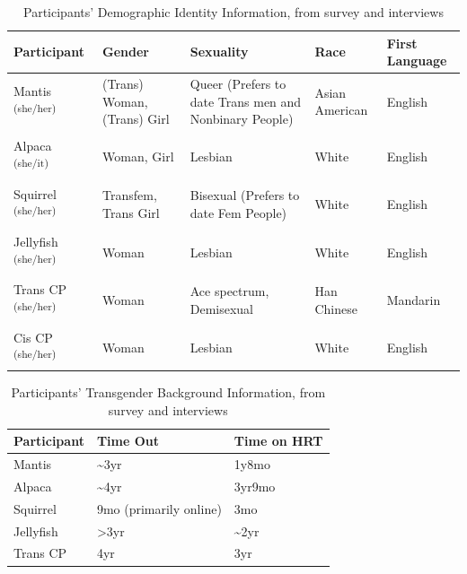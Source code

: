 \documentclass[12pt,twoside]{reedthesis}
\begin{document}
\begin{table}[h]
\begin{small}
\begin{tabular}{l p{2.8cm} p{3.2cm} p{2.2cm} p{1.8cm}} \toprule
Participant & Gender & Sexuality & Race & First \newline Language \\
\midrule
Mantis \textsuperscript{(she/her)} & (Trans) Woman, \newline (Trans) Girl & Queer (Prefers to date Trans men and Nonbinary People) & Asian American & English \\\\
Alpaca \textsuperscript{(she/it)} &  Woman, Girl & Lesbian & White & English \\\\
Squirrel \textsuperscript{(she/her)} &  Transfem, \newline Trans Girl & Bisexual (Prefers to date Fem People) & White & English \\\\
Jellyfish \textsuperscript{(she/her)} &  Woman & Lesbian & White & English \\\\
Trans CP \textsuperscript{(she/her)} &  Woman & Ace spectrum, \newline Demisexual & Han Chinese & Mandarin\\\\
Cis CP \textsuperscript{(she/her)} & Woman & Lesbian & White & English\\
\bottomrule
\end{tabular}
\end{small}
\label{demographics}
\caption{Participants' Demographic Identity Information, from survey and interviews}
\end{table}

\begin{table}[h]
\centering
\begin{small}
\begin{tabular}{l l l} \toprule
Participant & Time Out & Time on HRT  \\
\midrule
Mantis & \textasciitilde3yr & 1y8mo \\
Alpaca &  \textasciitilde4yr & 3yr9mo \\
Squirrel & 9mo (primarily online) & 3mo \\
Jellyfish & >3yr & \textasciitilde2yr \\
Trans CP & 4yr & 3yr \\
\bottomrule
\end{tabular}
\end{small}
\label{gender_backgrounds}
\caption{Participants' Transgender Background Information, from survey and interviews}
\end{table}
\end{document}
